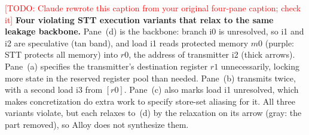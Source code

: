 \textcolor{red}{[TODO: Claude rewrote this caption from your original four-pane caption; check it]} \textbf{Four violating STT execution variants that relax to the same leakage backbone.} Pane~(d) is the backbone: branch i0 is unresolved, so i1 and i2 are speculative (tan band), and load i1 reads protected memory $m0$ (purple: STT protects all memory) into $r0$, the address of transmitter i2 (thick arrows). Pane~(a) specifies the transmitter's destination register $r1$ unnecessarily, locking more state in the reserved register pool than needed. Pane~(b) transmits twice, with a second load i3 from $[r0]$. Pane~(c) also marks load i1 unresolved, which makes concretization do extra work to specify store-set aliasing for it. All three variants violate, but each relaxes to~(d) by the relaxation on its arrow (gray: the part removed), so Alloy does not synthesize them.
